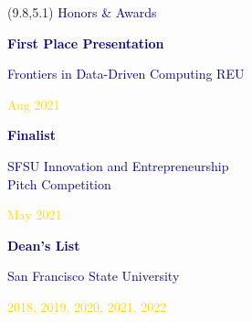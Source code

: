 \documentclass[hidelinks, 10pt]{article}
\begin{document}

\begin{textblock}{4}(9.8,5.1)
	\setlength{\parindent}{0cm}
    \large{\textcolor{navy}{Honors \& Awards}}

	\vspace{4mm}

	\footnotesize\textcolor{navy}{\scriptsize\textbf{First Place Presentation}}

	\vspace{0.5mm}

	\footnotesize\textcolor{navy}{\scriptsize Frontiers in Data-Driven Computing
	REU}

	\vspace{0.5mm}

	\scriptsize\textcolor{gold}{\scriptsize Aug 2021}

	\vspace{4mm}

	\footnotesize\textcolor{navy}{\scriptsize\textbf{Finalist}}

	\vspace{0.5mm}

	\scriptsize\textcolor{navy}{\scriptsize SFSU Innovation and Entrepreneurship\\Pitch Competition}

	\vspace{0.5mm}

	\scriptsize\textcolor{gold}{\scriptsize May 2021}

	\vspace{4mm}

	\footnotesize\textcolor{navy}{\scriptsize\textbf{Dean's List}}

	\vspace{0.5mm}

	\scriptsize\textcolor{navy}{\scriptsize San Francisco State University}

	\vspace{0.5mm}

	\scriptsize\textcolor{gold}{\scriptsize 2018, 2019, 2020, 2021, 2022}
\end{textblock}

\end{document}
